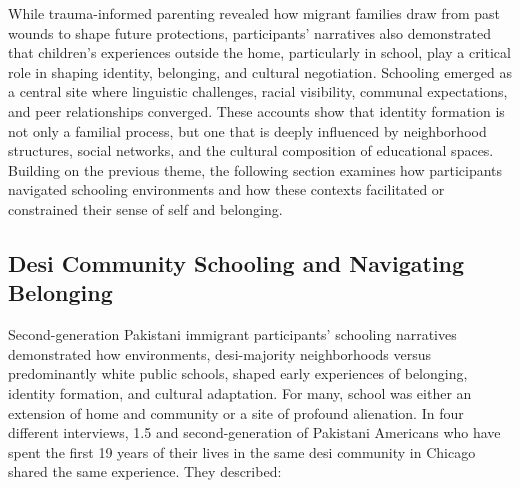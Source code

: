While trauma-informed parenting revealed how migrant families draw from past wounds to shape future protections, participants’ narratives also demonstrated that children’s experiences outside the home, particularly in school, play a critical role in shaping identity, belonging, and cultural negotiation. Schooling emerged as a central site where linguistic challenges, racial visibility, communal expectations, and peer relationships converged. These accounts show that identity formation is not only a familial process, but one that is deeply influenced by neighborhood structures, social networks, and the cultural composition of educational spaces. Building on the previous theme, the following section examines how participants navigated schooling environments and how these contexts facilitated or constrained their sense of self and belonging.

\subsection{Desi Community Schooling and Navigating Belonging}

Second-generation Pakistani immigrant participants’ schooling narratives demonstrated how environments, desi-majority neighborhoods versus predominantly white public schools, shaped early experiences of belonging, identity formation, and cultural adaptation. For many, school was either an extension of home and community or a site of profound alienation. In four different interviews, 1.5 and second-generation of Pakistani Americans who have spent the first 19 years of their lives in the same desi community in Chicago shared the same experience. They described:

